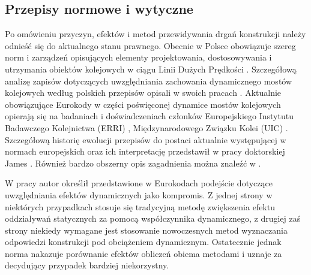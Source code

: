 \subsection{Przepisy normowe i wytyczne}
Po omówieniu przyczyn, efektów i metod przewidywania drgań konstrukcji należy odnieść się do aktualnego stanu prawnego. Obecnie w Polsce obowiązuje szereg norm i zarządzeń opisujących elementy projektowania, dostosowywania i utrzymania obiektów kolejowych w ciągu Linii Dużych Prędkości \parencite{PolskieLinieKolejoweS.A.2005,PolskieLinieKolejoweS.A.2009,PolskiKomitetNormalizacyjny,PolskiKomitetNormalizacyjny2004,PKNj}. Szczegółową analizę zapisów dotyczących uwzględniania zachowania dynamicznego mostów kolejowych według polskich przepisów opisali w swoich pracach \cite{Oleszek2015,Oleszek2015b,Oleszek2016a}. Aktualnie obowiązujące Eurokody w części poświęconej dynamice mostów kolejowych opierają się na badaniach i doświadczeniach członków Europejskiego Instytutu Badawczego Kolejnictwa (ERRI) \parencite{ERRI1998,Muncke2008}, Międzynarodowego Związku Kolei (UIC) \parencite{UnionInternationaleDesCheminsDeFer2006,UnionInternationaleDesCheminsDeFer2009}. Szczegółową historię ewolucji przepisów do postaci aktualnie występującej w normach europejskich oraz ich interpretację przedstawił w pracy doktorskiej James \cite{James2003}. Również bardzo obszerny opis zagadnienia można znaleźć w \parencite{Goicolea2002,Dias2007}.

W pracy \cite{Karas2011a} autor określił przedstawione w Eurokodach podejście dotyczące uwzględniania efektów dynamicznych  jako kompromis. Z jednej strony w niektórych przypadkach stosuje się tradycyjną metodę zwiększenia efektu oddziaływań statycznych za pomocą współczynnika dynamicznego, z drugiej zaś strony niekiedy wymagane jest stosowanie nowoczesnych metod wyznaczania odpowiedzi konstrukcji pod obciążeniem dynamicznym. Ostatecznie jednak norma nakazuje porównanie efektów obliczeń obiema metodami i uznaje za decydujący przypadek bardziej niekorzystny. 

